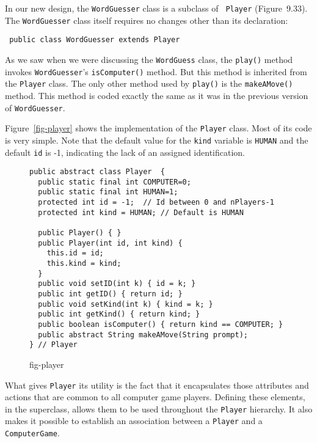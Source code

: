 In our new design, the {\tt WordGuesser} class is a subclass of {\tt
Player} (Figure~9.33).  The {\tt WordGuesser} class itself requires
no changes other than its declaration:

\begin{jjjlisting}
\begin{lstlisting}
 public class WordGuesser extends Player
\end{lstlisting}
\end{jjjlisting}

\noindent As we saw when we were discussing the {\tt WordGuess} class, the
{\tt play()} method invokes {\tt WordGuesser}'s {\tt isComputer()}
method. But this method is inherited from the {\tt Player} class.  The
only other method used by {\tt play()} is the {\tt makeAMove()}
method. This method is coded exactly the same as it was in the
previous version of {\tt WordGuesser}.

Figure~\ref{fig-player} shows the implementation of the {\tt Player}
class. Most of its code is very simple. Note that the default value
for the {\tt kind} variable is {\tt HUMAN} and the default {\tt id} is
-1, indicating the lack of an assigned identification.

\begin{figure}[h!]
\jjjprogstart
\begin{jjjlisting}
\begin{lstlisting}
public abstract class Player  {   
  public static final int COMPUTER=0;
  public static final int HUMAN=1;
  protected int id = -1;  // Id between 0 and nPlayers-1
  protected int kind = HUMAN; // Default is HUMAN

  public Player() { }
  public Player(int id, int kind) {
    this.id = id;
    this.kind = kind;
  }
  public void setID(int k) { id = k; }
  public int getID() { return id; }
  public void setKind(int k) { kind = k; }
  public int getKind() { return kind; }
  public boolean isComputer() { return kind == COMPUTER; }
  public abstract String makeAMove(String prompt); 
} // Player
\end{lstlisting}
\end{jjjlisting}
{fig-player}
\end{figure}

What gives {\tt Player} its utility is the fact that it encapsulates
those attributes and actions that are common to all computer game
players. Defining these elements, in the superclass, allows them to
be used throughout the {\tt Player} hierarchy.  It also makes it
possible to establish an association between a {\tt Player} and a {\tt
ComputerGame}.

